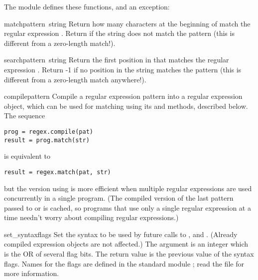 The module defines these functions, and an exception:

\renewcommand{\indexsubitem}{(in module regex)}
\begin{funcdesc}{match}{pattern\, string}
  Return how many characters at the beginning of  match
  the regular expression .  Return  if the
  string does not match the pattern (this is different from a
  zero-length match!).
\end{funcdesc}

\begin{funcdesc}{search}{pattern\, string}
  Return the first position in  that matches the regular
  expression .  Return -1 if no position in the string
  matches the pattern (this is different from a zero-length match
  anywhere!).
\end{funcdesc}

\begin{funcdesc}{compile}{pattern}
  Compile a regular expression pattern into a regular expression
  object, which can be used for matching using its  and
   methods, described below.  The sequence

\bcode\begin{verbatim}
prog = regex.compile(pat)
result = prog.match(str)
\end{verbatim}\ecode

is equivalent to

\bcode\begin{verbatim}
result = regex.match(pat, str)
\end{verbatim}\ecode

but the version using  is more efficient when multiple
regular expressions are used concurrently in a single program.  (The
compiled version of the last pattern passed to  or
 is cached, so programs that use only a single
regular expression at a time needn't worry about compiling regular
expressions.)
\end{funcdesc}

\begin{funcdesc}{set_syntax}{flags}
  Set the syntax to be used by future calls to ,
   and .  (Already compiled expression objects
  are not affected.)  The argument is an integer which is the OR of
  several flag bits.  The return value is the previous value of
  the syntax flags.  Names for the flags are defined in the standard
  module ; read the file  for
  more information.
\end{funcdesc}

